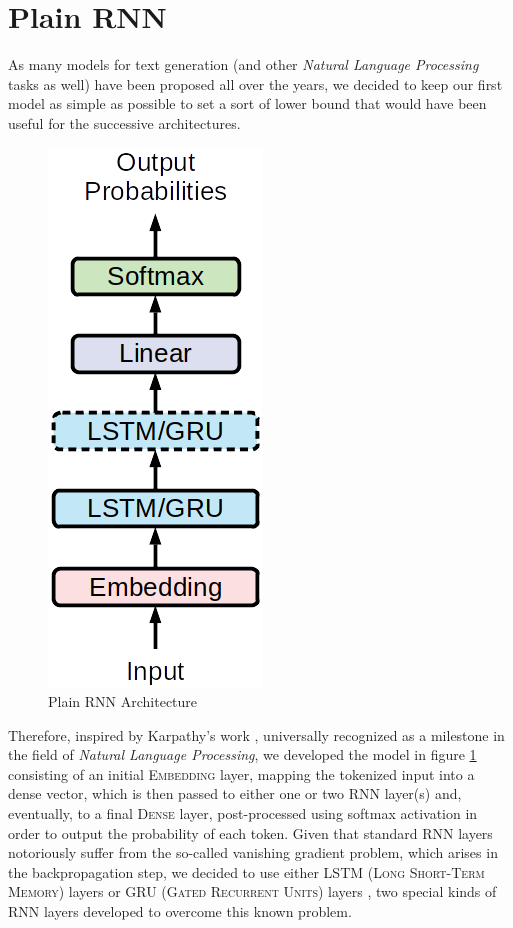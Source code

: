 \section{Plain RNN}

As many models for text generation (and other \textit{Natural Language Processing} tasks as well) have been proposed all over the years, we decided to keep our first model as simple as possible to set a sort of lower bound that would have been useful for the successive architectures.

\begin{figure}[!htb]
    \centering
    \includegraphics[scale=0.65]{images/model-1.png}%
    \caption{Plain RNN Architecture}%
    \label{plain-rnn}
\end{figure}

Therefore, inspired by Karpathy's work \parencite{karpathy2015unreasonable}, universally recognized as a milestone in the field of \textit{Natural Language Processing}, we developed the model in figure \ref{plain-rnn} consisting of an initial \textsc{Embedding} layer, mapping the tokenized input into a dense vector, which is then passed to either one or two \textsc{RNN} layer(s) and, eventually, to a final \textsc{Dense} layer, post-processed using softmax activation in order to output the probability of each token.
Given that standard \textsc{RNN} layers notoriously suffer from the so-called vanishing gradient problem, which arises in the backpropagation step, we decided to use either \textsc{LSTM} (\textsc{Long Short-Term Memory}) layers \parencite{hochreiter1997long} or \textsc{GRU} (\textsc{Gated Recurrent Units}) layers \parencite{chung2014empirical}, two special kinds of \textsc{RNN} layers developed to overcome this known problem.

